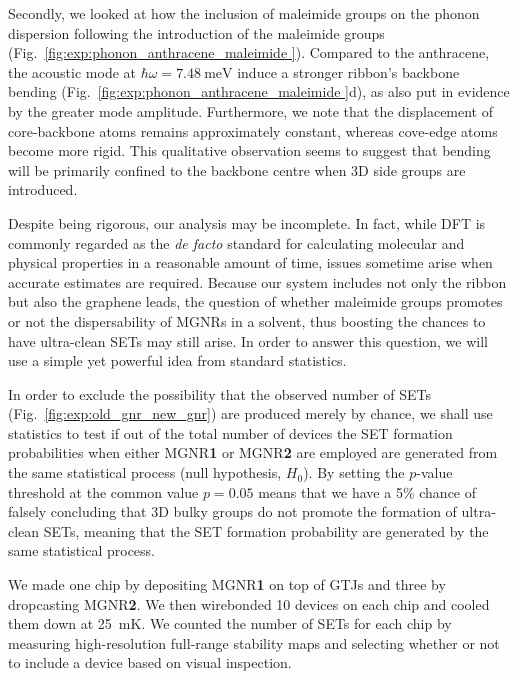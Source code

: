 Secondly, we looked at how the inclusion of maleimide  groups on the phonon dispersion following the introduction of the maleimide  groups (Fig.~\ref{fig:exp:phonon_anthracene_maleimide }). Compared to the anthracene, the acoustic mode at $\hbar\omega = \SI{7.48}{\milli\electronvolt}$ induce a stronger ribbon's backbone bending (Fig.~\ref{fig:exp:phonon_anthracene_maleimide }d), as also put in evidence by the greater mode amplitude. Furthermore, we note that the displacement of core-backbone atoms remains approximately constant, whereas cove-edge atoms become more rigid. This qualitative observation seems to suggest that bending will be primarily confined to the backbone centre when 3D side groups are introduced.

Despite being rigorous, our analysis may be incomplete. In fact, while \gls{DFT} is commonly regarded as the \textit{de facto} standard for calculating molecular and physical properties in a reasonable amount of time, issues sometime arise when accurate estimates are required. Because our system includes not only the ribbon but also the graphene leads, the question of whether maleimide groups promotes or not the dispersability of \glspl{MGNR} in a solvent, thus boosting the chances to have ultra-clean \glspl{SET} may still arise. In order to answer this question, we will use a simple yet powerful idea from standard statistics.

In order to exclude the possibility that the observed number of \glspl{SET} (Fig.~\ref{fig:exp:old_gnr_new_gnr}) are produced merely by chance, we shall use statistics to test if out of the total number of devices the \gls{SET} formation probabilities when either \gls{MGNR}\textbf{1} or \gls{MGNR}\textbf{2} are employed are generated from the same statistical process (null hypothesis, $H_0$). By setting the $p$-value threshold at the common value $p=0.05$ means that we have a 5\% chance of falsely concluding that 3D bulky groups do not promote the formation of ultra-clean \glspl{SET}, meaning that the \gls{SET} formation probability are generated by the same statistical process.

We made one chip by depositing \gls{MGNR}\textbf{1} on top of \glspl{GTJ} and three by dropcasting \gls{MGNR}\textbf{2}. We then wirebonded 10 devices on each chip and cooled them down at \SI{25}{\milli\kelvin}. We counted the number of \glspl{SET} for each chip by measuring high-resolution full-range stability maps and selecting whether or not to include a device based on visual inspection.

